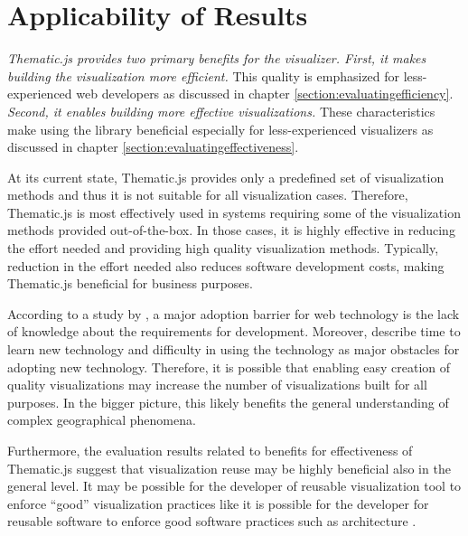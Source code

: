 \section{Applicability of Results}

\emph{Thematic.js provides two primary benefits for the visualizer. First, it makes building the visualization more efficient.} This quality is emphasized for less-experienced web developers as discussed in chapter \ref{section:evaluatingefficiency}. \emph{Second, it enables building more effective visualizations.} These characteristics make using the library beneficial especially for less-experienced visualizers as discussed in chapter \ref{section:evaluatingeffectiveness}.

At its current state, Thematic.js provides only a predefined set of visualization methods and thus it is not suitable for all visualization cases. Therefore, Thematic.js is most effectively used in systems requiring some of the visualization methods provided out-of-the-box. In those cases, it is highly effective in reducing the effort needed and providing high quality visualization methods. Typically, reduction in the effort needed also reduces software development costs, making Thematic.js beneficial for business purposes. 

According to a study by \citet{nambisan_technical_1999}, a major adoption barrier for web technology is the lack of knowledge about the requirements for development. Moreover, \citet{butler_barriers_2002} describe time to learn new technology and difficulty in using the technology as major obstacles for adopting new technology. Therefore, it is possible that enabling easy creation of quality visualizations may increase the number of visualizations built for all purposes. In the bigger picture, this likely benefits the general understanding of complex geographical phenomena.

Furthermore, the evaluation results related to benefits for effectiveness of Thematic.js suggest that visualization reuse may be highly beneficial also in the general level. It may be possible for the developer of reusable visualization tool to enforce ``good'' visualization practices like it is possible for the developer for reusable software to enforce good software practices such as architecture \citep{mohagheghi_quality_2007}.


